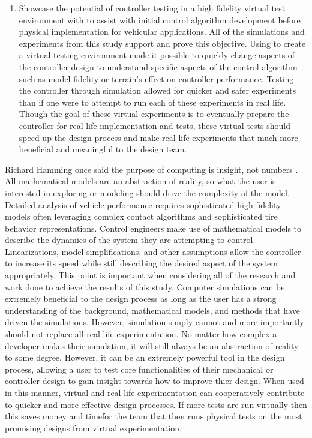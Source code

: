 \documentclass[12pt,onecolumn]{report}
\newcommand{\CHRONO}{{\sffamily{{Chrono}}}}
\begin{document}
\begin{enumerate}
\item
Showcase the potential of controller testing in a high fidelity virtual test environment with {\CHRONO} to assist with initial control algorithm development before physical implementation for vehicular applications. All of the simulations and experiments from this study support and prove this objective. Using {\CHRONO} to create a virtual testing environment made it possible to quickly change aspects of the controller design to understand specific aspects of the control algorithm such as model fidelity or terrain's effect on controller performance. Testing the controller through simulation allowed for quicker and safer experiments than if one were to attempt to run each of these experiments in real life. Though the goal of these virtual experiments is to eventually prepare the controller for real life implementation and tests, these virtual tests should speed up the design process and make real life experiments that much more beneficial and meaningful to the design team. 
\end{enumerate}

Richard Hamming once said the purpose of computing is insight, not numbers \cite{NumMethods}. All mathematical models are an abstraction of reality, so what the user is interested in exploring or modeling should drive the complexity of the model. Detailed analysis of vehicle performance requires sophisticated high fidelity models often leveraging complex contact algorithms and sophisticated tire behavior representations. Control engineers make use of mathematical models to describe the dynamics of the system they are attempting to control. Linearizations, model simplifications, and other assumptions allow the controller to increase its speed while still describing the desired aspect of the system appropriately. This point is important when considering all of the research and work done to achieve the results of this study. Computer simulations can be extremely beneficial to the design process as long as the user has a strong understanding of the background, mathematical models, and methods that have driven the simulations. However, simulation simply cannot and more importantly should not replace all real life experimentation. No matter how complex a developer makes their simulation, it will still always be an abstraction of reality to some degree. However, it can be an extremely powerful tool in the design process, allowing a user to test core functionalities of their mechanical or controller design to gain insight towards how to improve thier design. When used in this manner, virtual and real life experimentation can cooperatively contribute to quicker and more effective design processes. If more tests are run virtually then this saves money and timefor the team that then runs physical tests on the most promising designs from virtual experimentation.  
\end{document}
